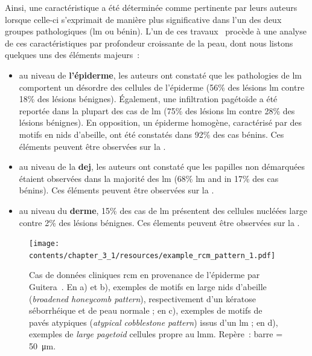 Ainsi, une caractéristique a été déterminée comme pertinente par leurs auteurs~\cite{Pellacani2007, Guitera2010} lorsque celle-ci s'exprimait de manière plus significative dans l'un des deux groupes pathologiques (\gls{lm} ou bénin). L'un de ces travaux~\cite{Guitera2010} procède à une analyse de ces caractéristiques par profondeur croissante de la peau, dont nous listons quelques uns des éléments majeurs~:
\begin{itemize}
    \item au niveau de \textbf{l'épiderme}, les auteurs ont constaté que les pathologies de \gls{lm} comportent un désordre des cellules de l'épiderme (56\% des lésions \gls{lm} contre 18\% des lésions bénignes). Également, une infiltration pagétoïde a été reportée dans la plupart des cas de \gls{lm} (75\% des lésions \gls{lm} contre 28\% des lésions bénignes). En opposition, un épiderme homogène, caractérisé par des motifs en nids d'abeille, ont été constatés dans 92\% des cas bénins. Ces éléments peuvent être observées sur la .
    \item au niveau de la \textbf{\gls{dej}}, les auteurs ont constaté que les papilles non démarquées étaient observées dans la majorité des \gls{lm} (68\% \gls{lm} and in 17\% des cas bénins). Ces éléments peuvent être observées sur la  .
    \item au niveau du \textbf{derme}, 15\% des cas de \gls{lm} présentent des cellules nucléées large contre 2\% des lésions bénignes. Ces élements peuvent être observées sur la .
\end{itemize}\par

\begin{figure}[H]
    \begin{center}
        \texttt{[image: contents/chapter\_3\_1/resources/example\_rcm\_pattern\_1.pdf]}
        \caption{Cas de données cliniques \gls{rcm} en provenance de l'épiderme par Guitera~\cite{Guitera2010}. En a) et b), exemples de motifs en large nids d'abeille (\textit{broadened honeycomb pattern}), respectivement d'un kératose séborrhéique et de peau normale ; en c), exemples de motifs de pavés atypiques (\textit{atypical cobblestone pattern}) issus d'un \gls{lm} ; en d), exemples de \textit{large pagetoid} cellules propre au \gls{lmm}. Repère~: barre = \SI{50}{\micro\metre}.}
        \label{fig:example_rcm_pattern_1}
    \end{center} 
\end{figure}\par

